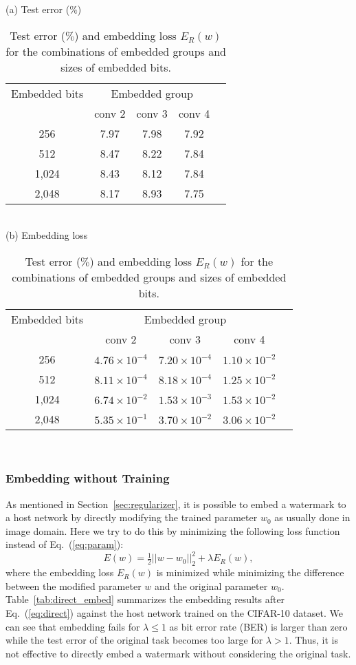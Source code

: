 \documentclass[10pt,twocolumn,letterpaper]{article}
\begin{document}
\begin{table}[tb]
	\centering
	\caption{Test error ($\%$) and embedding loss $E_R (w)$ for the combinations of embedded groups and sizes of embedded bits.}
	\label{tab:capacity}
	(a) Test error ($\%$) \\
	\begin{tabular}{c|cccc} \hline
Embedded bits	& \multicolumn{3}{c}{Embedded group}	\\
& conv 2	& conv 3	& conv 4	\\ \hline
256				& 7.97		& 7.98		& 7.92	\\
512				& 8.47		& 8.22		& 7.84	\\
1,024			& 8.43		& 8.12		& 7.84	\\
2,048			& 8.17		& 8.93		& 7.75	\\ \hline
	\end{tabular} \\
	(b) Embedding loss \\
	\begin{tabular}{c|cccc} \hline
Embedded bits	& \multicolumn{3}{c}{Embedded group}	\\
& conv 2	& conv 3	& conv 4	\\ \hline
256				& $4.76{\times}10^{-4}$	& $7.20{\times}10^{-4}$	& $1.10{\times}10^{-2}$	\\
512				& $8.11{\times}10^{-4}$	& $8.18{\times}10^{-4}$	& $1.25{\times}10^{-2}$	\\
1,024			& $6.74{\times}10^{-2}$	& $1.53{\times}10^{-3}$	& $1.53{\times}10^{-2}$	\\
2,048			& $5.35{\times}10^{-1}$	& $3.70{\times}10^{-2}$	& $3.06{\times}10^{-2}$	\\ \hline
	\end{tabular} \\
\end{table}



\subsubsection{Embedding without Training}
\label{sec:direct}
As mentioned in Section~\ref{sec:regularizer}, it is possible to embed a watermark to a host network by directly modifying the trained parameter $w_0$ as usually done in image domain.
Here we try to do this by minimizing the following loss function instead of Eq.~(\ref{eq:param}):
\begin{equation}
\label{eq:direct}
E(w) = \tfrac{1}{2} ||w - w_0||^2_2 + \lambda E_R (w),
\end{equation}
where the embedding loss $E_R (w)$ is minimized while minimizing the difference between the modified parameter $w$ and the original parameter $w_0$.
Table~\ref{tab:direct_embed} summarizes the embedding results after Eq.~(\ref{eq:direct}) against the host network trained on the CIFAR-10 dataset.
We can see that embedding fails for $\lambda \le 1$ as bit error rate (BER) is larger than zero while the test error of the original task becomes too large for  $\lambda > 1$.
Thus, it is not effective to directly embed a watermark without considering the original task.
\end{document}
